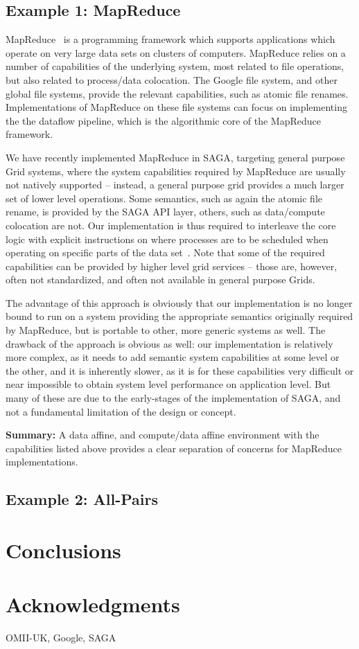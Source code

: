 \documentclass{article}
\newcommand{\B}[1]{\textbf{#1}}
\newcommand{\up}{\vspace*{-1em}}
\begin{document}
 \up
 \subsection{Example 1: MapReduce}

  MapReduce~\cite{mapreduce-paper} is a programming framework which
  supports applications which operate on very large data sets on
  clusters of computers.  MapReduce relies on a number of capabilities
  of the underlying system, most related to file operations, but also
  related to process/data colocation.  The Google file system, and
  other global file systems, provide the relevant capabilities, such
  as atomic file renames.  Implementations of MapReduce on these file
  systems can focus on implementing the the dataflow pipeline, which
  is the algorithmic core of the MapReduce framework.

  We have recently implemented MapReduce in SAGA, targeting general
  purpose Grid systems, where the system capabilities required by
  MapReduce are usually not natively supported -- instead, a general
  purpose grid provides a much larger set of lower level operations.
  Some semantics, such as again the atomic file rename, is provided by
  the SAGA API layer, others, such as data/compute colocation are not.
  Our implementation is thus required to interleave the core logic
  with explicit instructions on where processes are to be scheduled
  when operating on specific parts of the data set~\cite{gsoc-saga}.
  Note that some of the required capabilities can be provided by
  higher level grid services -- those are, however, often not
  standardized, and often not available in general purpose Grids.

  The advantage of this approach is obviously that our implementation
  is no longer bound to run on a system providing the appropriate
  semantics originally required by MapReduce, but is portable to
  other, more generic systems as well.  The drawback of the approach
  is obvious as well: our implementation is relatively more complex,
  as it needs to add semantic system capabilities at some level or the
  other, and it is inherently slower, as it is for these capabilities
  very difficult or near impossible to obtain system level performance
  on application level.  But many of these are due to the early-stages
  of the implementation of SAGA, and not a fundamental limitation of
  the design or concept.

  \B{Summary:} A data affine, and compute/data affine environment with
  the capabilities listed above provides a clear separation of
  concerns for MapReduce implementations.


 \up
 \subsection{Example 2: All-Pairs}

\section{Conclusions}
\label{sec:conclusion}



\section{Acknowledgments}
\label{sec:acks}

OMII-UK, Google, SAGA

\footnotesize


\end{document}
